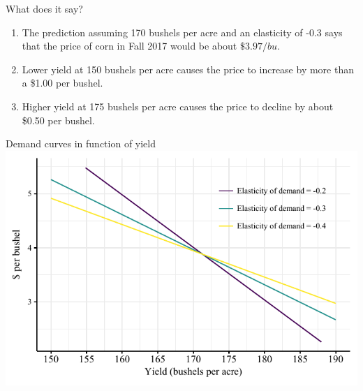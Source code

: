 \documentclass[table,xcolor=pdftex,dvipsnames, handout]{beamer}\usepackage[]{graphicx}\usepackage[]{color}
\makeatletter
\def\maxwidth{ %
  \ifdim\Gin@nat@width>\linewidth
    \linewidth
  \else
    \Gin@nat@width
  \fi
}
\newenvironment{knitrout}{}{} %
\makeatother
\begin{document}

\begin{frame}{What does it say?}
\begin{enumerate}[label=\textbullet]
  \item The prediction assuming 170 bushels per acre and an elasticity of -0.3 says that the price of corn in Fall 2017 would be about $\$3.97 /bu$.
  \item Lower yield at 150 bushels per acre causes the price to increase by more than a \$1.00 per bushel.
  \item Higher yield at 175 bushels per acre causes the price to decline by about \$0.50 per bushel.
\end{enumerate}
\end{frame}


\begin{frame}{Demand curves in function of yield}
\begin{knitrout}
\color{fgcolor}
\includegraphics[width=\maxwidth]{figure/figure_demand_plot-1} 

\end{knitrout}
\end{frame}


\end{document}
